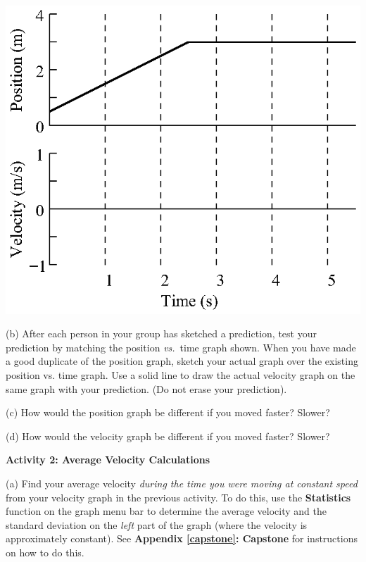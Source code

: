 \vspace{0.3cm}
{\par\centering \includegraphics{relating/relating_fig1.eps} \par}
\vspace{0.3cm}

(b) After each person in your group has sketched a prediction, test your prediction
by matching the position \textit{vs.}~time graph shown. When you have made a good duplicate
of the position graph, sketch your actual graph over the existing position vs. time graph.
Use a solid line to draw the actual velocity graph on the same graph with
your prediction. (Do not erase your prediction).

(c) How would the position graph be different if you moved faster? Slower? 
\answerspace{15mm}

(d) How would the velocity graph be different if you moved faster? Slower? 
\answerspace{15mm}

\textbf{Activity 2: Average Velocity Calculations} 

(a) Find your average velocity \emph{during the time you were moving at constant speed} from your velocity graph in the previous activity. To do this, use the \textbf{Statistics} function on the graph menu bar to determine the average velocity and the standard deviation on the \emph{left} part of the graph (where the velocity is approximately constant). See \textbf{Appendix \ref{capstone}: Capstone} for instructions on how to do this.

